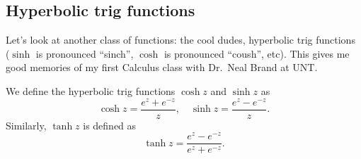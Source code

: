 \subsection{Hyperbolic trig functions}
Let's look at another class of functions: the cool dudes, hyperbolic trig functions ($\sinh$ is pronounced ``sinch'', $\cosh$ is pronounced ``coush'', etc). This gives me good memories of my first Calculus class with Dr.\ Neal Brand at UNT.
\begin{definition}
    We define the hyperbolic trig functions $\cosh z$ and $\sinh z $ as \[
    \cosh z = \frac{e^{z}+e^{-z}}{z},\quad \sinh z = \frac{e^{z}-e^{-z}}{z}.
    \] Similarly, $\tanh z$ is defined as \[
    \tanh z = \frac{e^{z}-e^{-z}}{e^{z}+e^{-z}}.
    \] 
\end{definition}


